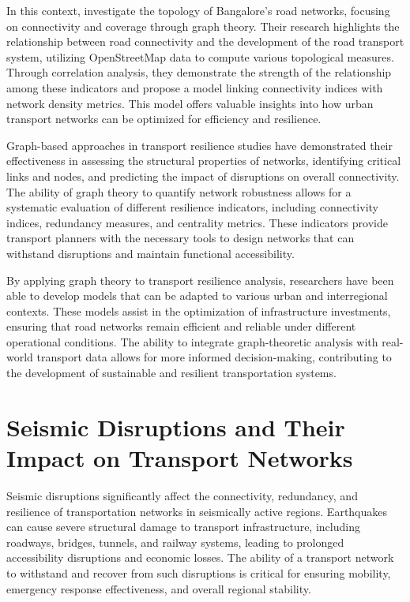 In this context, \cite{thottolil2021} investigate the topology of Bangalore’s road networks, focusing on connectivity and coverage through graph theory. Their research highlights the relationship between road connectivity and the development of the road transport system, utilizing OpenStreetMap data to compute various topological measures. Through correlation analysis, they demonstrate the strength of the relationship among these indicators and propose a model linking connectivity indices with network density metrics. This model offers valuable insights into how urban transport networks can be optimized for efficiency and resilience.

Graph-based approaches in transport resilience studies have demonstrated their effectiveness in assessing the structural properties of networks, identifying critical links and nodes, and predicting the impact of disruptions on overall connectivity. The ability of graph theory to quantify network robustness allows for a systematic evaluation of different resilience indicators, including connectivity indices, redundancy measures, and centrality metrics. These indicators provide transport planners with the necessary tools to design networks that can withstand disruptions and maintain functional accessibility.

By applying graph theory to transport resilience analysis, researchers have been able to develop models that can be adapted to various urban and interregional contexts. These models assist in the optimization of infrastructure investments, ensuring that road networks remain efficient and reliable under different operational conditions. The ability to integrate graph-theoretic analysis with real-world transport data allows for more informed decision-making, contributing to the development of sustainable and resilient transportation systems.
\section{Seismic Disruptions and Their Impact on Transport Networks}
Seismic disruptions significantly affect the connectivity, redundancy, and resilience of transportation networks in seismically active regions. Earthquakes can cause severe structural damage to transport infrastructure, including roadways, bridges, tunnels, and railway systems, leading to prolonged accessibility disruptions and economic losses. The ability of a transport network to withstand and recover from such disruptions is critical for ensuring mobility, emergency response effectiveness, and overall regional stability.

